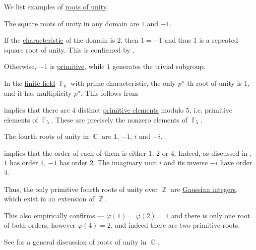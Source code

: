 \begin{example}\label{ex:def:root_of_unity}
  We list examples of \hyperref[def:root_of_unity]{roots of unity}.
  \begin{thmenum}
     The square roots of unity in any domain are \( 1 \) and \( -1 \).

    If the \hyperref[def:ring_characteristic]{characteristic} of the domain is \( 2 \), then \( 1 = -1 \) and thus \( 1 \) is a repeated square root of unity. This is confirmed by .

    Otherwise, \( -1 \) is \hyperref[def:primitive_root_of_unity]{primitive}, while \( 1 \) generates the trivial subgroup.

     In the \hyperref[def:finite_field]{finite field} \( \BbbF_p \) with prime characteristic, the only \( p^n \)-th root of unity is \( 1 \), and it has multiplicity \( p^n \). This follows from 

      implies that there are \( 4 \) distinct \hyperref[def:finite_field_primitive_element]{primitive elements} modulo \( 5 \), i.e. primitive elements of \( \BbbF_5 \). These are precisely the nonzero elements of \( \BbbF_5 \).

     The fourth roots of unity in \( \BbbC \) are \( 1 \), \( -1 \), \( i \) and \( -i \).

     implies that the order of each of them is either \( 1 \), \( 2 \) or \( 4 \). Indeed, as discussed in , \( 1 \) has order \( 1 \), \( -1 \) has order \( 2 \). The imaginary unit \( i \) and its inverse \( -i \) have order \( 4 \).

    Thus, the only primitive fourth roots of unity over \( \BbbZ \) are \hyperref[def:gaussian_integers]{Gaussian integers}, which exist in an extension of \( \BbbZ \).

    This also empirically confirms  --- \( \varphi(1) = \varphi(2) = 1 \) and there is only one root of both orders, however \( \varphi(4) = 2 \), and indeed there are two primitive roots.

    See  for a general discussion of roots of unity in \( \BbbC \).


\end{thmenum}
\end{example}
